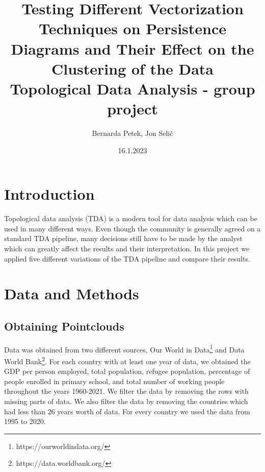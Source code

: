 \documentclass[12pt]{article}
\begin{document}
	
	
	
	
	\title{Testing Different Vectorization Techniques on Persistence Diagrams and Their Effect on the Clustering of the Data \\   \large  Topological Data Analysis - group project}
	\author{%
		Bernarda Petek, Jon Selič} %
	
	\date{16.1.2023}
	\maketitle
	
	
	
\section{Introduction}
Topological data analysis (TDA) is a modern tool for data analysis which can be used in many different ways. Even though the community is generally agreed on a standard TDA pipeline, many decisions still have to be made by the analyst which can greatly affect the results and their interpretation. In this project we applied five different variations of the TDA pipeline and compare their results.

\section{Data and Methods}
\subsection{Obtaining Pointclouds}
Data was obtained from two different sources, Our World in Data\footnote{https://ourworldindata.org/} and Data World Bank\footnote{https://data.worldbank.org/}. For each country with at least one year of data, we obtained the GDP per person employed, total population, refugee population, percentage of people enrolled in primary school, and total number of working people throughout the years 1960-2021. We filter the data by removing the rows with missing parts of data. We also filter the data by removing the countries which had less than 26 years worth of data. For every country we used the data from 1995 to 2020.
\end{document}
